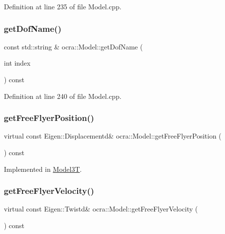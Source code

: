 Definition at line 235 of file Model.\+cpp.

\hypertarget{classocra_1_1Model_ad64d41ddb52236bee343d27572cd7020}{}\label{classocra_1_1Model_ad64d41ddb52236bee343d27572cd7020} 
\subsubsection{\texorpdfstring{get\+Dof\+Name()}{getDofName()}}
{\footnotesize\ttfamily const std\+::string \& ocra\+::\+Model\+::get\+Dof\+Name (\begin{DoxyParamCaption}\item[{int}]{index }\end{DoxyParamCaption}) const}



Definition at line 240 of file Model.\+cpp.

\hypertarget{classocra_1_1Model_a7549d8ca32c46a84ea4799730a81dae2}{}\label{classocra_1_1Model_a7549d8ca32c46a84ea4799730a81dae2} 
\subsubsection{\texorpdfstring{get\+Free\+Flyer\+Position()}{getFreeFlyerPosition()}}
{\footnotesize\ttfamily virtual const Eigen\+::\+Displacementd\& ocra\+::\+Model\+::get\+Free\+Flyer\+Position (\begin{DoxyParamCaption}{ }\end{DoxyParamCaption}) const\hspace{0.3cm}{\ttfamily [pure virtual]}}



Implemented in \hyperlink{classModel3T_ab9a2a5644b40341af54e408dd8d1b0de}{Model3T}.

\hypertarget{classocra_1_1Model_a0a11fff87a21ab37535420f7a7544c96}{}\label{classocra_1_1Model_a0a11fff87a21ab37535420f7a7544c96} 
\subsubsection{\texorpdfstring{get\+Free\+Flyer\+Velocity()}{getFreeFlyerVelocity()}}
{\footnotesize\ttfamily virtual const Eigen\+::\+Twistd\& ocra\+::\+Model\+::get\+Free\+Flyer\+Velocity (\begin{DoxyParamCaption}{ }\end{DoxyParamCaption}) const\hspace{0.3cm}{\ttfamily [pure virtual]}}



